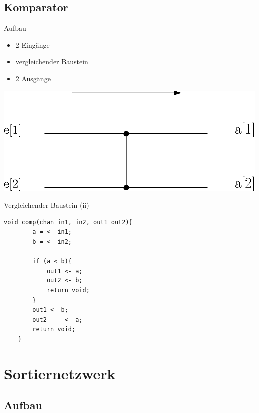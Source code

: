 \documentclass[ucs,9pt]{beamer}
\begin{document}
\subsection{Komparator}
\begin{frame}{Aufbau}
    \begin{minipage}[c]{14.5cm}
    		\begin{minipage}[c]{5cm}
        		\begin{itemize}
            		\item 2 Eingänge
	            \item vergleichender Baustein
    		        \item 2 Ausgänge
        		\end{itemize}
	    \end{minipage}
		\begin{minipage}[c]{5cm}
			\includegraphics[scale=0.5]{Komparator1.eps}
	 	\end{minipage}
    \end{minipage}
\end{frame}

\begin{frame}[fragile]{Vergleichender Baustein (ii)}
\begin{lstlisting}[laguage={inform},tabsize=4]
    void comp(chan in1, in2, out1 out2){
        a = <- in1;
        b = <- in2;
        
        if (a < b){
            out1 <- a;
            out2 <- b;
            return void;
        }
        out1 <- b;
        out2	 <- a;
        return void;
    }
\end{lstlisting}
\end{frame}

\section{Sortiernetzwerk}
\subsection{Aufbau}
\end{document}
